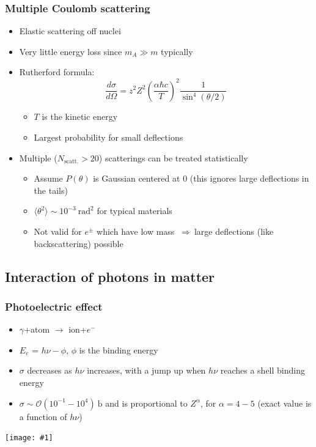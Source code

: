 \documentclass[11pt]{article}
\newcommand{\ra}{\rangle}
\newcommand{\la}{\langle}
\newcommand{\dd}[2]{\dfrac{d #1}{d #2}}
\newcommand{\ba}{\text{b}}
\newcommand{\el}{\ensuremath{e^{-}}\xspace}
\newcommand{\ord}[1]{\ensuremath{\mathcal{O}(#1)}}
\newcommand{\thus}{$~\Rightarrow~$}
\newcommand{\embedimgw}[2]{\begin{center}\texttt{[image: \#1]}\end{center}}
\begin{document}
\subsubsection{Multiple Coulomb scattering}
\begin{itemize}
  \item Elastic scattering off nuclei
  \item Very little energy loss since $m_{A} \gg m$ typically
  \item Rutherford formula:
  \begin{equation}
    \dd{\sigma}{\Omega} = z^2Z^2 \left(\frac{\alpha\hbar c}{T}\right)^2 \frac{1}{\sin^4(\theta/2)}
  \end{equation}
  \begin{itemize}
    \item $T$ is the kinetic energy
    \item Largest probability for small deflections
  \end{itemize}
  \item Multiple ($N_\text{scatt.}>20$) scatterings can be treated statistically
  \begin{itemize}
    \item Assume $P(\theta)$ is Gaussian centered at $0$ (this ignores large deflections in the tails)
    \item $\la \theta^2\ra \sim 10^{-3}~\text{rad}^2$ for typical materials
    \item Not valid for $e^{\pm}$ which have low mass \thus large deflections (like backscattering) possible
  \end{itemize}
\end{itemize}

\subsection{Interaction of photons in matter}

\subsubsection{Photoelectric effect}
\begin{itemize}
  \item $\gamma$+atom $\rightarrow$ ion+$\el$
  \item $E_e$ = $h\nu - \phi$, $\phi$ is the binding energy
  \item $\sigma$ decreases as $h\nu$ increases, with a jump up when $h\nu$ reaches a shell binding energy
  \item $\sigma\sim \ord{10^{-1}-10^{4}}~\ba$ and is proportional to $Z^\alpha$, for $\alpha=4-5$ (exact value is a function of $h\nu$)
\end{itemize}
  \embedimgw{figs/sigma_pe.png}{.8}
\end{document}
